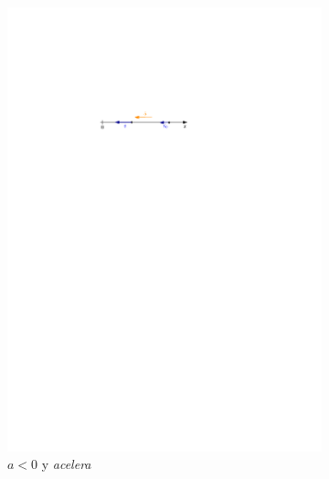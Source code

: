\begin{figure}[H]
\begin{subfigure}{0.5\textwidth}
 	\includegraphics[width=.9\linewidth]{img/acelera3.pdf}
	\caption{$a<0$ y \textit{acelera}}	
\end{subfigure} 
 \begin{subfigure}{0.5\textwidth}
    \centering

\end{subfigure}
\end{figure}
